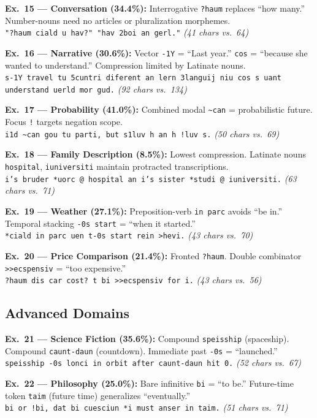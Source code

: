 \documentclass[10pt,onecolumn,letterpaper]{article}
\newcommand{\me}[1]{\texttt{#1}}
\begin{document}
\textbf{Ex.~15 --- Conversation (34.4\%):} Interrogative \me{?haum} replaces ``how many.'' Number-nouns need no articles or pluralization morphemes.\\
\me{"?haum ciald u hav?" "hav 2boi an gerl."} \textit{(41 chars vs.\ 64)}

\textbf{Ex.~16 --- Narrative (30.6\%):} Vector \me{-1Y} = ``Last year.'' \me{cos} = ``because she wanted to understand.'' Compression limited by Latinate nouns.\\
\me{s-1Y travel tu 5cuntri diferent an lern 3languij niu cos s uant understand uerld mor gud.} \textit{(92 chars vs.\ 134)}

\textbf{Ex.~17 --- Probability (41.0\%):} Combined modal \me{\~{}can} = probabilistic future. Focus \me{!} targets negation scope.\\
\me{i1d \~{}can gou tu parti, but s1luv h an h !luv s.} \textit{(50 chars vs.\ 69)}

\textbf{Ex.~18 --- Family Description (8.5\%):} Lowest compression. Latinate nouns \me{hospital}, \me{iuniversiti} maintain protracted transcriptions.\\
\me{i's bruder *uorc @ hospital an i's sister *studi @ iuniversiti.} \textit{(63 chars vs.\ 71)}

\textbf{Ex.~19 --- Weather (27.1\%):} Preposition-verb \me{in parc} avoids ``be in.'' Temporal stacking \me{-0s start} = ``when it started.''\\
\me{*ciald in parc uen t-0s start rein >hevi.} \textit{(43 chars vs.\ 70)}

\textbf{Ex.~20 --- Price Comparison (21.4\%):} Fronted \me{?haum}. Double combinator \me{>>ecspensiv} = ``too expensive.''\\
\me{?haum dis car cost? t bi >>ecspensiv for i.} \textit{(43 chars vs.\ 56)}

\subsection{Advanced Domains}

\textbf{Ex.~21 --- Science Fiction (35.6\%):} Compound \me{speisship} (spaceship). Compound \me{caunt-daun} (countdown). Immediate past \me{-0s} = ``launched.''\\
\me{speisship -0s lonci in orbit after caunt-daun hit 0.} \textit{(52 chars vs.\ 67)}

\textbf{Ex.~22 --- Philosophy (25.0\%):} Bare infinitive \me{bi} = ``to be.'' Future-time token \me{taim} (future time) generalizes ``eventually.''\\
\me{bi or !bi, dat bi cuesciun *i must anser in taim.} \textit{(51 chars vs.\ 71)}
\end{document}
